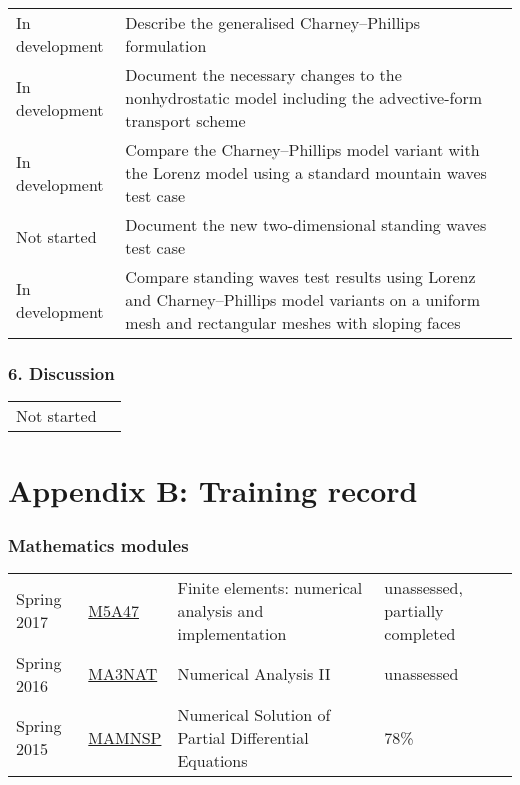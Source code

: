 \documentclass[a4paper,11pt]{article}
\begin{document}
\begin{tabularx}{\linewidth}{>{\hsize=1.3in}X X}
	In development & Describe the generalised Charney--Phillips formulation \\
	In development & Document the necessary changes to the nonhydrostatic model including the advective-form transport scheme \\
	In development & Compare the Charney--Phillips model variant with the Lorenz model using a standard mountain waves test case \citep{schaer2002} \\
	Not started & Document the new two-dimensional standing waves test case \\
	In development & Compare standing waves test results using Lorenz and Charney--Phillips model variants on a uniform mesh and rectangular meshes with sloping faces
\end{tabularx}

\subsubsection*{6. Discussion}
\vspace*{0.5em}

\begin{tabularx}{\linewidth}{>{\hsize=0.9in}X X}
Not started & 
\end{tabularx}


\newpage

\section*{Appendix B: Training record}

\subsubsection*{Mathematics modules}
\begin{tabular}{l l l l}
Spring 2017	& \href{https://finite-element.github.io}{M5A47}  & Finite elements: numerical analysis and implementation & unassessed, partially completed \\
Spring 2016	& \href{www.reading.ac.uk/module/document.aspx?modP=MA3NAT&modYR=1516}{MA3NAT} & Numerical Analysis II & unassessed \\
Spring 2015	& \href{www.reading.ac.uk/modules/document.aspx?modP=MAMNSP&modYR=1415}{MAMNSP} & Numerical Solution of Partial Differential Equations  & 78\% \\
\end{tabular}
\end{document}

